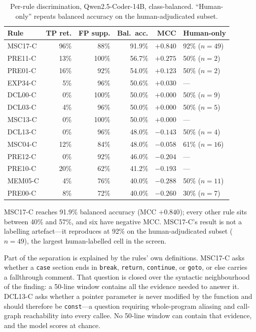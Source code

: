 \begin{table}[t]
\centering
\small
\caption{Per-rule discrimination, Qwen2.5-Coder-14B, class-balanced.
``Human-only'' repeats balanced accuracy on the human-adjudicated
subset.}
\label{tab:llm-per-rule}
\begin{tabular}{lrrrrl}
\hline
Rule & TP ret. & FP supp. & Bal.\ acc. & MCC & Human-only \\
\hline
MSC17-C & 96\% & 88\%  & 91.9\% & $+0.840$ & 92\% ($n{=}49$) \\
PRE11-C & 13\% & 100\% & 56.7\% & $+0.275$ & 50\% ($n{=}2$) \\
PRE01-C & 16\% & 92\%  & 54.0\% & $+0.123$ & 50\% ($n{=}2$) \\
EXP34-C & 5\%  & 96\%  & 50.6\% & $+0.030$ & --- \\
DCL00-C & 0\%  & 100\% & 50.0\% & $+0.000$ & 50\% ($n{=}9$) \\
DCL03-C & 4\%  & 96\%  & 50.0\% & $+0.000$ & 50\% ($n{=}5$) \\
MSC13-C & 0\%  & 100\% & 50.0\% & $+0.000$ & --- \\
DCL13-C & 0\%  & 96\%  & 48.0\% & $-0.143$ & 50\% ($n{=}4$) \\
MSC04-C & 12\% & 84\%  & 48.0\% & $-0.058$ & 61\% ($n{=}16$) \\
PRE12-C & 0\%  & 92\%  & 46.0\% & $-0.204$ & --- \\
PRE10-C & 20\% & 62\%  & 41.2\% & $-0.193$ & --- \\
MEM05-C & 4\%  & 76\%  & 40.0\% & $-0.288$ & 50\% ($n{=}11$) \\
PRE00-C & 8\%  & 72\%  & 40.0\% & $-0.260$ & 30\% ($n{=}7$) \\
\hline
\end{tabular}
\end{table}

MSC17-C reaches 91.9\% balanced accuracy (MCC $+0.840$); every other
rule sits between 40\% and 57\%, and six have negative MCC.  MSC17-C's
result is not a labelling artefact---it reproduces at 92\% on the
human-adjudicated subset ($n{=}49$), the largest human-labelled cell in
the screen.

Part of the separation is explained by the rules' own definitions.
MSC17-C asks whether a \texttt{case}
section ends in \texttt{break}, \texttt{return}, \texttt{continue}, or
\texttt{goto}, or else carries a fallthrough comment.  That question is
closed over the syntactic neighbourhood of the finding: a 50-line
window contains all the evidence needed to answer it.  DCL13-C asks
whether a pointer parameter is never modified by the function and
should therefore be \texttt{const}---a question requiring whole-program
aliasing and call-graph reachability into every callee.  No 50-line
window can contain that evidence, and the model scores at chance.

